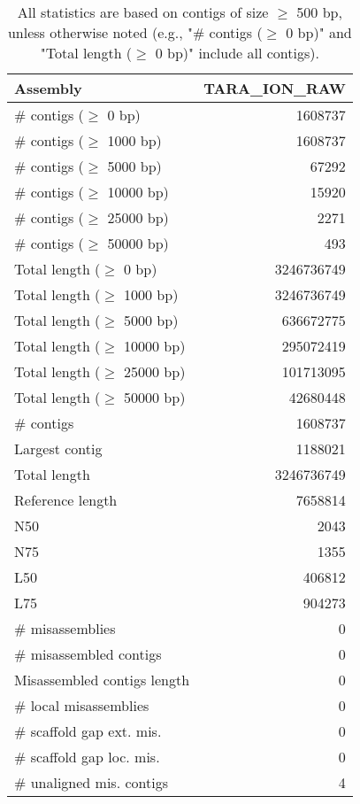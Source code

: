 \documentclass[12pt,a4paper]{article}
\begin{document}
\begin{table}[ht]
\begin{center}
\caption{All statistics are based on contigs of size $\geq$ 500 bp, unless otherwise noted (e.g., "\# contigs ($\geq$ 0 bp)" and "Total length ($\geq$ 0 bp)" include all contigs).}
\begin{tabular}{|l*{1}{|r}|}
\hline
Assembly & TARA\_ION\_RAW \\ \hline
\# contigs ($\geq$ 0 bp) & 1608737 \\ \hline
\# contigs ($\geq$ 1000 bp) & 1608737 \\ \hline
\# contigs ($\geq$ 5000 bp) & 67292 \\ \hline
\# contigs ($\geq$ 10000 bp) & 15920 \\ \hline
\# contigs ($\geq$ 25000 bp) & 2271 \\ \hline
\# contigs ($\geq$ 50000 bp) & 493 \\ \hline
Total length ($\geq$ 0 bp) & 3246736749 \\ \hline
Total length ($\geq$ 1000 bp) & 3246736749 \\ \hline
Total length ($\geq$ 5000 bp) & 636672775 \\ \hline
Total length ($\geq$ 10000 bp) & 295072419 \\ \hline
Total length ($\geq$ 25000 bp) & 101713095 \\ \hline
Total length ($\geq$ 50000 bp) & 42680448 \\ \hline
\# contigs & 1608737 \\ \hline
Largest contig & 1188021 \\ \hline
Total length & 3246736749 \\ \hline
Reference length & 7658814 \\ \hline
N50 & 2043 \\ \hline
N75 & 1355 \\ \hline
L50 & 406812 \\ \hline
L75 & 904273 \\ \hline
\# misassemblies & 0 \\ \hline
\# misassembled contigs & 0 \\ \hline
Misassembled contigs length & 0 \\ \hline
\# local misassemblies & 0 \\ \hline
\# scaffold gap ext. mis. & 0 \\ \hline
\# scaffold gap loc. mis. & 0 \\ \hline
\# unaligned mis. contigs & 4 \\ \hline

\end{tabular}
\end{center}
\end{table}
\end{document}
